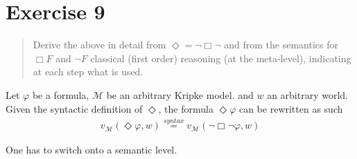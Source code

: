 \documentclass[11pt,a4paper]{article}
\newcommand{\some}{\Diamond}
\newcommand{\all}{\Box}
\begin{document}


\section*{Exercise 9}
\begin{quote}
Derive the above in detail from $\some = \neg \all \neg $ and from the semantics for $\all F$ and $\neg F$ classical (first order) reasoning (at the meta-level), indicating at each step what is used.
\end{quote}

Let $\varphi$ be a formula, $\mathcal{M}$ be an arbitrary Kripke model. and $w$ an arbitrary world. Given the syntactic definition of $\some$, the formula $\some \varphi$ can be rewritten as such
\begin{equation*}
\begin{split}
v_{\mathcal{M}}(\some \varphi, w) \stackrel{syntax}{=} v_{\mathcal{M}}(\neg \all \neg \varphi,w)
\end{split}
\end{equation*}

One has to switch onto a semantic level.
\end{document}

